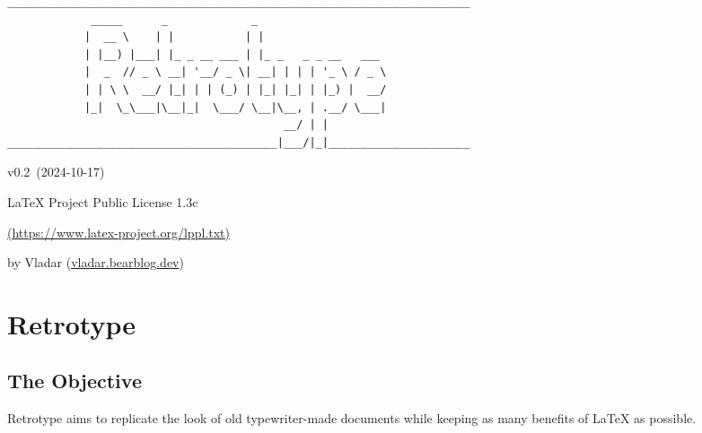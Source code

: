 \documentclass[english,12pt,openany,letterpaper]{book}
\def\author{Vladar}
\def\license{LaTeX Project Public License 1.3c}
\def\licenselink{https://www.latex-project.org/lppl.txt}
\def\rtVer{0.2}
\def\rtDate{2024-10-17}
\begin{document}

\begin{titlepage}

\begin{verbatim}
________________________________________________________________________
             _____      _             _                                 
            |  __ \    | |           | |                                
            | |__) |___| |_ _ __ ___ | |_ _   _ _ __   ___              
            |  _  // _ \ __| '__/ _ \| __| | | | '_ \ / _ \             
            | | \ \  __/ |_| | | (_) | |_| |_| | |_) |  __/             
            |_|  \_\___|\__|_|  \___/ \__|\__, | .__/ \___|             
                                           __/ | |
__________________________________________|___/|_|______________________
\end{verbatim}

{\hfill v\rtVer~(\rtDate)}

\vfill

\begin{adjustbox}{center}
\end{adjustbox}

\vfill
\vfill

{\hfill\license\hfill}

{\hfill\href{\licenselink}{(\licenselink)}\hfill}

{\hfill{}by \author{} (\href{https://vladar.bearblog.dev}{vladar.bearblog.dev})\hfill}

\end{titlepage}


\toc[3]

\chapter{Retrotype}

\clearBg
\clearFg

\rightbox[\baselineskip]{{\bfseries\itshape \rtDate}}

\section{The Objective}

Retrotype aims to replicate the look of old typewriter-made documents while keeping as many benefits of LaTeX as possible.
\end{document}
